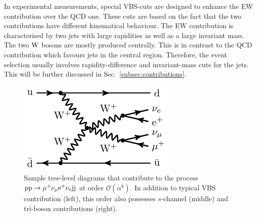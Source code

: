 In experimental measurements, special VBS-cuts are designed to enhance the EW contribution over the QCD one.
These cuts are based on the fact that the two contributions have different kinematical behaviour.
The EW contribution is characterised by two jets with large rapidities as well as a large invariant mass.
The two $\text{W}$ bosons are mostly produced centrally.
This is in contrast to the QCD contribution which favours jets in the central region.
Therefore, the event selection usually involves rapidity-difference and invariant-mass cuts for the jets.
This will be further discussed in Sec.~\ref{subsec:contributions}.
\begin{figure}[t]
\begin{center}
          \includegraphics[width=0.30\linewidth]{feynman/LO_EW_5}
\end{center}
        \caption{Sample tree-level diagrams that contribute to the process $\text{p}\text{p}\to\mu^+\nu_\mu\text{e}^+\nu_{\text{e}}\text{j}\text{j}$ at order $\mathcal{O}{\left(\alpha^{6}\right)}$.
        In addition to typical VBS contribution (left), this order also possesses $s$-channel (middle) and tri-boson contributions (right). }
\label{diag:LO}
\end{figure}
